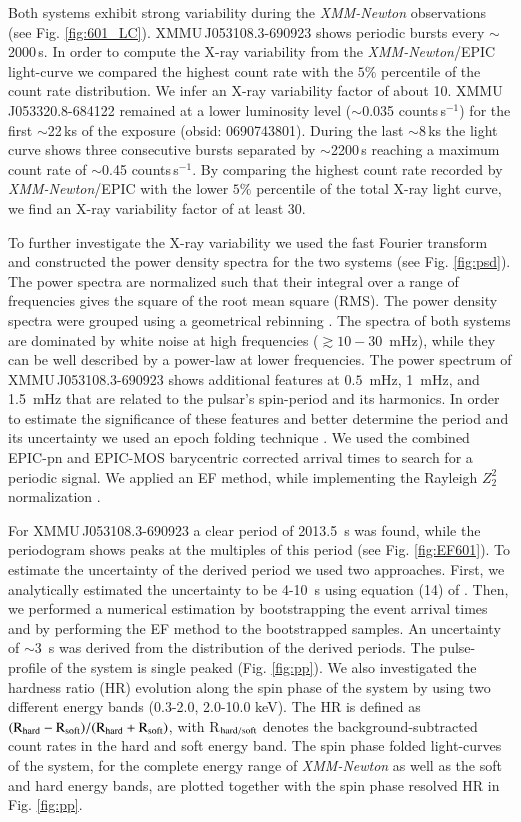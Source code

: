 \documentclass[a4paper,fleqn,usenatbib]{mnras}
\newcommand{\xmm}{{\it XMM-Newton}\xspace}
\newcommand{\canda}{XMMU\,J053108.3-690923\xspace} %
\newcommand{\candb}{XMMU\,J053320.8-684122\xspace} %
\begin{document}
Both systems exhibit strong variability during the \xmm observations (see Fig. \ref{fig:601_LC}). 
\canda shows periodic bursts every $\sim$2000\,s.
In order to compute the X-ray variability from the \xmm/EPIC light-curve we compared the highest count rate with the $5\%$ percentile of the count rate distribution. We infer an X-ray variability factor of about 10. 
\candb remained at a lower luminosity level ($\sim$0.035 counts\,s$^{-1}$) for the first $\sim$22\,ks of the exposure (obsid: 0690743801). During the last $\sim$8\,ks the light curve shows three consecutive bursts separated by $\sim$2200\,s reaching a maximum count rate of $\sim$0.45 counts\,s$^{-1}$. 
By comparing the highest count rate recorded by \xmm/EPIC with the lower $5\%$ percentile of the total X-ray light curve, we find an X-ray variability factor of at least 30. 


To further investigate the X-ray variability we used the fast Fourier transform \citep{1988tns..conf...27V} and constructed the power density spectra for the two systems (see Fig. \ref{fig:psd}). The power spectra are normalized such that their integral over a range of frequencies gives the square of the root mean square (RMS). The power density spectra were grouped using a geometrical rebinning \citep{1993MNRAS.261..612P}. The spectra of both systems are dominated by white noise at high frequencies ($\gtrsim 10-30$~mHz), while they can be well described by a power-law at lower frequencies. 
The power spectrum of \canda shows additional features at $0.5$~mHz, 1~mHz, and 1.5~mHz that are related to the pulsar's spin-period and its harmonics.
In order to estimate the significance of these features and better determine the period and its uncertainty we used an epoch folding technique \citep[EF:][]{1990MNRAS.244...93D,1996A&AS..117..197L}. 
We used the combined EPIC-pn and EPIC-MOS barycentric corrected arrival times to search for a periodic signal.
We applied an EF method, while implementing the Rayleigh $Z^2_2$ normalization \citep{1983A&A...128..245B}.

For \canda a clear period of 2013.5~s was found, while the periodogram shows peaks at the multiples of this period (see Fig. \ref{fig:EF601}). To estimate the uncertainty of the derived period we used two approaches. First, we analytically estimated the uncertainty to be 4-10~s using equation (14) of \citet{1986ApJ...302..757H}. Then, we performed a numerical estimation by bootstrapping the event arrival times and by performing the EF method to the bootstrapped samples. An uncertainty of $\sim$3~s was derived from the distribution of the derived periods.
The pulse-profile of the system is single peaked (Fig. \ref{fig:pp}).
We also investigated the hardness ratio (HR) evolution along the spin phase of the system by using two different energy bands (0.3-2.0, 2.0-10.0 keV). The HR is defined as $(\rm{R}_{\rm{hard}}-\rm{R}_{\rm{soft}})/(\rm{R}_{\rm{hard}}+\rm{R}_{\rm{soft}})$, with R$_{\rm hard/soft}$ denotes the background-subtracted count rates in the hard and soft energy band.
The spin phase folded light-curves of the system, for the complete energy range of \xmm as well as the soft and hard energy bands, are plotted together with the spin phase resolved HR in Fig. \ref{fig:pp}.
\end{document}

